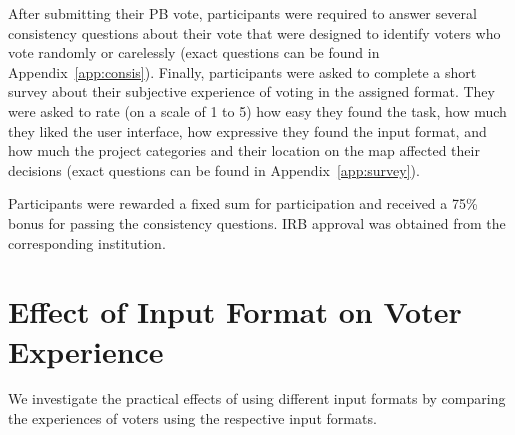 \documentclass{comsoc2023}
\begin{document}
 After   submitting their PB vote, participants were required to answer several consistency questions about their vote that were  designed to identify voters who vote randomly or carelessly (exact questions can be found in Appendix~\ref{app:consis}).  Finally, participants were asked to complete a short survey about their subjective experience of voting in the assigned format. They were asked to rate (on a scale of 1 to 5) how easy they found the task, how much they liked the user interface, %
  how   expressive  they found the input format, 
 and how much the project categories and their location on the map    affected their decisions (exact questions can be found in Appendix~\ref{app:survey}). 
 
 Participants were rewarded a  fixed sum    for participation and  received a 75\% bonus for passing the  consistency questions.
 IRB approval was obtained from the corresponding institution.


\section{Effect of Input Format on Voter Experience}


We investigate the practical effects of using different input formats by comparing  the experiences of voters using the respective input formats.
\end{document}
